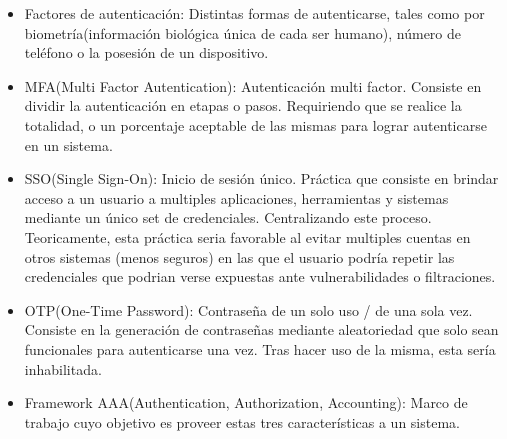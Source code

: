 \documentclass{article}
\begin{document}
\begin{itemize}
		\item Factores de autenticación: Distintas formas de autenticarse, tales como por biometría(información biológica única de cada ser humano), número de teléfono o la posesión de un dispositivo.
		
		\item MFA(Multi Factor Autentication): Autenticación multi factor. Consiste en dividir la autenticación en etapas o pasos. Requiriendo que se realice la totalidad, o un porcentaje aceptable de las mismas para lograr autenticarse en un sistema.
		
		\item SSO(Single Sign-On): Inicio de sesión único. Práctica que consiste en brindar acceso a un usuario a multiples aplicaciones, herramientas y sistemas mediante un único set de credenciales. Centralizando este proceso. Teoricamente, esta práctica seria favorable al evitar multiples cuentas en otros sistemas (menos seguros) en las que el usuario podría repetir las credenciales que podrian verse expuestas ante vulnerabilidades o filtraciones. 
		
		\item OTP(One-Time Password): Contraseña de un solo uso / de una sola vez. Consiste en la generación de contraseñas mediante aleatoriedad que solo sean funcionales para autenticarse una vez. Tras hacer uso de la misma, esta sería inhabilitada.
		
		\item Framework AAA(Authentication, Authorization, Accounting): Marco de trabajo cuyo objetivo es proveer estas tres características a un sistema. 
		
	\end{itemize}
	
	
	
	
\end{document}
